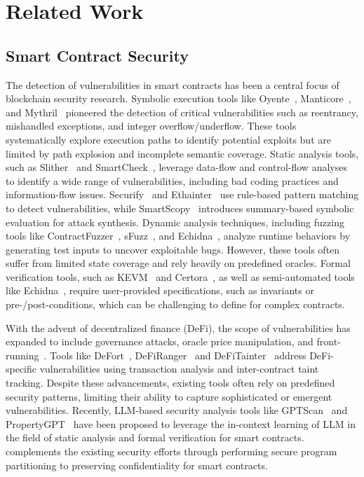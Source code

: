 \section{Related Work}
\label{sec:relate}
\subsection{Smart Contract Security}
The detection of vulnerabilities in smart contracts has been a central focus of blockchain security research. Symbolic execution tools like Oyente~\cite{luu2016making}, Manticore~\cite{manticore}, and Mythril~\cite{mythril} pioneered the detection of critical vulnerabilities such as reentrancy, mishandled exceptions, and integer overflow/underflow. These tools systematically explore execution paths to identify potential exploits but are limited by path explosion and incomplete semantic coverage. Static analysis tools, such as Slither~\cite{feist2019slither} and SmartCheck~\cite{tikhomirov2018smartcheck}, leverage data-flow and control-flow analyses to identify a wide range of vulnerabilities, including bad coding practices and information-flow issues. Securify~\cite{tsankov2018securify} and Ethainter~\cite{brent2020ethainter} use rule-based pattern matching to detect vulnerabilities, while SmartScopy~\cite{feng2019precise} introduces summary-based symbolic evaluation for attack synthesis.
Dynamic analysis techniques, including fuzzing tools like ContractFuzzer~\cite{2018contractfuzzer}, sFuzz~\cite{nguyen2020sfuzz}, and Echidna~\cite{echidna}, analyze runtime behaviors by generating test inputs to uncover exploitable bugs. However, these tools often suffer from limited state coverage and rely heavily on predefined oracles. Formal verification tools, such as KEVM~\cite{hildenbrandt2018kevm} and Certora~\cite{Certora}, as well as semi-automated tools like Echidna~\cite{echidna}, require user-provided specifications, such as invariants or pre-/post-conditions, which can be challenging to define for complex contracts.

With the advent of decentralized finance (DeFi), the scope of vulnerabilities has expanded to include governance attacks, oracle price manipulation, and front-running~\cite{zhou2023sok, werner2022sok}. Tools like DeFort~\cite{xie2024defort}, DeFiRanger~\cite{wu2021defiranger} and DeFiTainter~\cite{kong2023defitainter} address DeFi-specific vulnerabilities using transaction analysis and inter-contract taint tracking. Despite these advancements, existing tools often rely on predefined security patterns, limiting their ability to capture sophisticated or emergent vulnerabilities.
Recently, LLM-based security analysis tools like GPTScan~\cite{sun2024gptscan} and PropertyGPT~\cite{liu2024propertygpt} have been proposed to leverage the in-context learning of LLM in the field of static analysis and formal verification for smart contracts.
\tool complements the existing security efforts through performing secure program partitioning to preserving confidentiality for smart contracts.

